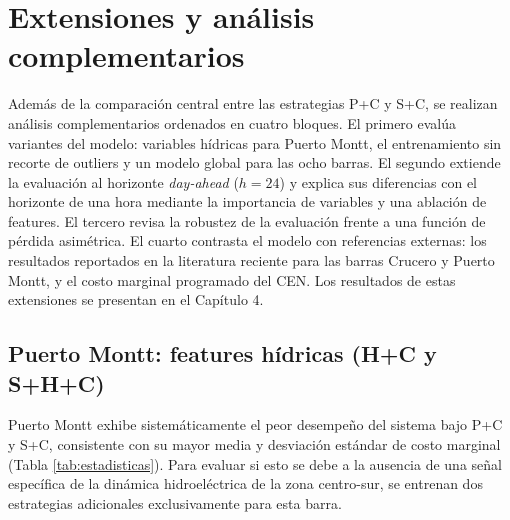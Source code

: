 \section{Extensiones y análisis complementarios}
\label{sec:extensiones_meta}

Además de la comparación central entre las estrategias P+C y S+C, se realizan análisis complementarios ordenados en cuatro bloques. El primero evalúa variantes del modelo: variables hídricas para Puerto Montt, el entrenamiento sin recorte de outliers y un modelo global para las ocho barras. El segundo extiende la evaluación al horizonte \textit{day-ahead} ($h=24$) y explica sus diferencias con el horizonte de una hora mediante la importancia de variables y una ablación de features. El tercero revisa la robustez de la evaluación frente a una función de pérdida asimétrica. El cuarto contrasta el modelo con referencias externas: los resultados reportados en la literatura reciente para las barras Crucero y Puerto Montt, y el costo marginal programado del CEN. Los resultados de estas extensiones se presentan en el Capítulo 4.

\subsection{Puerto Montt: features hídricas (H+C y S+H+C)}
\label{sec:pmontt_meta}

Puerto Montt exhibe sistemáticamente el peor desempeño del sistema bajo P+C y S+C, consistente con su mayor media y desviación estándar de costo marginal (Tabla \ref{tab:estadisticas}). Para evaluar si esto se debe a la ausencia de una señal específica de la dinámica hidroeléctrica de la zona centro-sur, se entrenan dos estrategias adicionales exclusivamente para esta barra.

